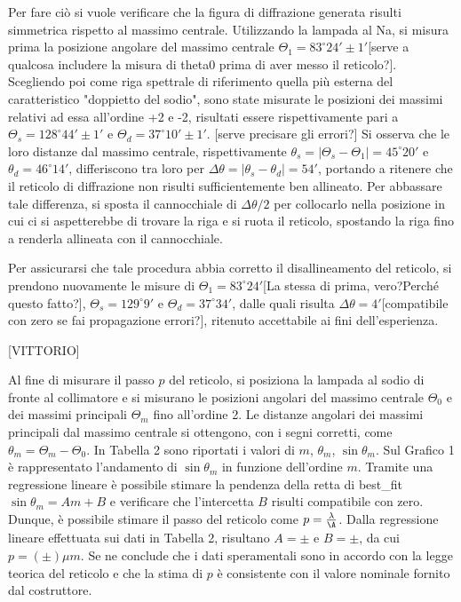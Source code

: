 \documentclass{article}
\begin{document}
 
Per fare ciò si vuole verificare che la figura di diffrazione generata risulti simmetrica rispetto al massimo centrale.
Utilizzando la lampada al Na, si misura prima la posizione angolare del massimo centrale $\Theta_1 = 83^\circ 24' \pm 1'$[serve a qualcosa includere la misura di theta0 prima di aver messo il reticolo?].
Scegliendo poi come riga spettrale di riferimento quella più esterna del caratteristico "doppietto del sodio", sono state misurate le posizioni dei massimi relativi ad essa all'ordine +2 e -2, risultati essere rispettivamente pari a $\Theta_s = 128^\circ 44' \pm 1'$ e $\Theta_d = 37^\circ 10' \pm 1'$. [serve precisare gli errori?]
Si osserva che le loro distanze dal massimo centrale, rispettivamente $\theta_s = |\Theta_s - \Theta_1| = 45^\circ20'$ e $\theta_d = 46^\circ 14'$, differiscono tra loro per $\Delta\theta = |\theta_s - \theta_d| = 54'$, portando a ritenere che il reticolo di diffrazione non risulti sufficientemente ben allineato.
Per abbassare tale differenza, si sposta il cannocchiale di $\Delta\theta/2$ per collocarlo nella posizione in cui ci si aspetterebbe di trovare la riga e si ruota il reticolo, spostando la riga fino a renderla allineata con il cannocchiale.

Per assicurarsi che tale procedura abbia corretto il disallineamento del reticolo, si prendono nuovamente le misure di $\Theta_1 = 83^\circ 24'$[La stessa di prima, vero?Perché questo fatto?], $\Theta_s = 129^\circ 9'$ e $\Theta_d = 37^\circ 34'$, dalle quali risulta $\Delta\theta = 4'$[compatibile con zero se fai propagazione errori?], ritenuto accettabile ai fini dell'esperienza. 


[VITTORIO]

Al fine di misurare il passo $p$ del reticolo, si posiziona la lampada al sodio di fronte al collimatore e si misurano le posizioni angolari del massimo centrale $\Theta_0$ e dei massimi principali $\Theta_m$ fino all'ordine 2. Le distanze angolari dei massimi principali dal massimo centrale si ottengono, con i segni corretti, come $\theta_m = \Theta_m - \Theta_0$. In Tabella 2 sono riportati i valori di $m$, $\theta_m$, $\sin \theta_m$. Sul Grafico 1 è rappresentato l'andamento di $\sin \theta_m$ in funzione dell'ordine $m$. Tramite una regressione lineare è possibile stimare la pendenza della retta di best_fit $\sin \theta_m = Am + B$ e verificare che l'intercetta $B$ risulti compatibile con zero. Dunque, è possibile stimare il passo del reticolo come $p=\frac{\lambda}{\A}$. Dalla regressione lineare effettuata sui dati in Tabella 2, risultano $A=\pm$ e $B=\pm$, da cui $p=(\pm)\mu m$. Se ne conclude che i dati speramentali sono in accordo con la legge teorica del reticolo e che la stima di $p$ è consistente con il valore nominale fornito dal costruttore.
\end{document}
